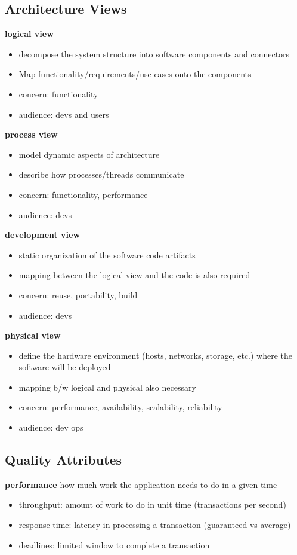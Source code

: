\documentclass[]{article}
\theoremstyle{definition}
\begin{document}
	\subsection{Architecture Views}
	\textbf{logical view} 
	\begin{itemize}
		\item decompose the system structure into software components and connectors
		\item Map functionality/requirements/use cases onto the components
		\item concern: functionality
		\item audience: devs and users
	\end{itemize}
	\textbf{process view}
	\begin{itemize}
		\item model dynamic aspects of architecture
		\item describe how processes/threads communicate
		\item concern: functionality, performance
		\item audience: devs
	\end{itemize}
	\textbf{development view} 
	\begin{itemize}
		\item static organization of the software code artifacts
		\item mapping between the logical view and the code is also required
		\item concern: reuse, portability, build
		\item audience: devs
	\end{itemize}
	\textbf{physical view}
	\begin{itemize}
		\item define the hardware environment (hosts, networks, storage, etc.) where the software will be deployed
		\item mapping b/w logical and physical also necessary
		\item concern: performance, availability, scalability, reliability
		\item audience: dev ops
	\end{itemize}

	\subsection{Quality Attributes}
	\textbf{performance} how much work the application needs to do in a given time
	\begin{itemize}
		\item throughput: amount of work to do in unit time (transactions per second)
		\item response time: latency in processing a transaction (guaranteed vs average)
		\item deadlines: limited window to complete a transaction
	\end{itemize}
\end{document}

